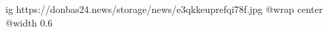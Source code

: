  
 
 
 
 

\ifcmt
  ig https://donbas24.news/storage/news/e3qkkeuprefqi78f.jpg
  @wrap center
  @width 0.6
\fi

